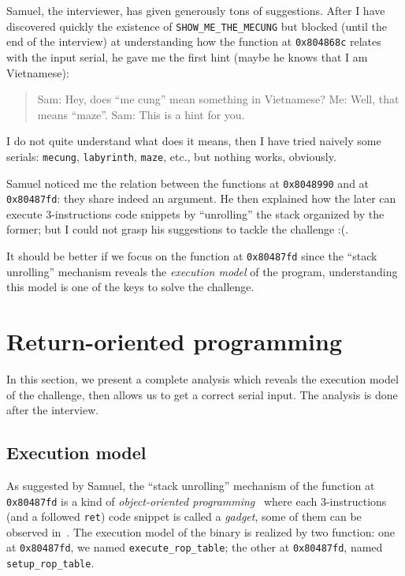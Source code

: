\documentclass{easychair}
\begin{document}
Samuel, the interviewer, has given generously tons of suggestions. After I have discovered quickly the existence of \texttt{SHOW\_ME\_THE\_MECUNG} but blocked (until the end of the interview) at understanding how the function at \texttt{0x804868c} relates with the input serial, he gave me the first hint (maybe he knows that I am Vietnamese):
\begin{quote}
  Sam: Hey, does ``me cung'' mean something in Vietnamese?\newline
  Me: Well, that means ``maze''.\newline
  Sam: This is a hint for you. 
\end{quote}
I do not quite understand what does it means, then I have tried naively some serials: \texttt{mecung}, \texttt{labyrinth}, \texttt{maze}, etc., but nothing works, obviously. 

Samuel noticed me the relation between the functions at \texttt{0x8048990} and at \texttt{0x80487fd}: they share indeed an argument. He then explained how the later can execute $3$-instructions code snippets by ``unrolling''  the stack organized by the former; but I could not grasp his suggestions to tackle the challenge :(.

It should be better if we focus on the function at \texttt{0x80487fd} since the ``stack unrolling'' mechanism reveals the \emph{execution model} of the program, understanding this model is one of the keys to solve the challenge.

\section{Return-oriented programming}
\label{sec:detail_analysis}

In this section, we present a complete analysis which reveals the execution model of the challenge, then allows us to get a correct serial input. The analysis is done after the interview.

\subsection{Execution model}
\label{sec:execution_model}

As suggested by Samuel, the ``stack unrolling'' mechanism of the function at \texttt{0x80487fd} is a kind of \emph{object-oriented programming}~\autocite{shacham2007geometry} where each $3$-instructions (and a followed \texttt{ret}) code snippet is called a \emph{gadget}, some of them can be observed in~. 
The execution model of the binary is realized by two function: one at \texttt{0x80487fd}, we named \texttt{execute\_rop\_table}; the other at \texttt{0x80487fd}, named \texttt{setup\_rop\_table}.
\end{document}
